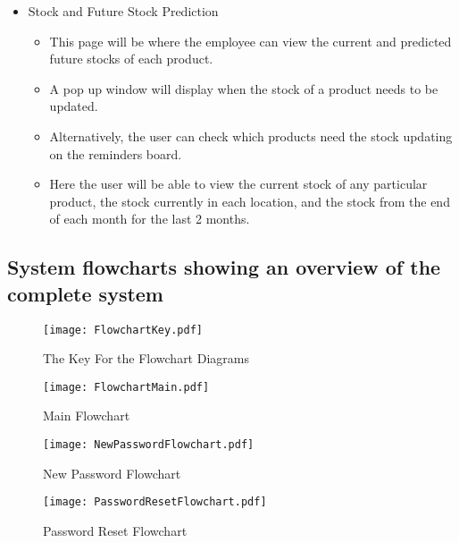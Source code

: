 \begin{itemize}
	\item Stock and Future Stock Prediction
	\begin{itemize}
		\item This page will be where the employee can view the current and predicted future stocks of each product.
		\item A pop up window will display when the stock of a product needs to be updated.
		\item Alternatively, the user can check which products need the stock updating on the reminders board.
		\item Here the user will be able to view the current stock of any particular product, the stock currently in each location, and the stock from the end of each month for the last 2 months.
	\end{itemize}
\end{itemize}

\subsection{System flowcharts showing an overview of the complete system}

\begin{landscape}
\begin{figure}[H]
\caption{The Key For the Flowchart Diagrams} \label{fig:FlowchartKey}
\hfill\texttt{[image: FlowchartKey.pdf]}\hspace*{\fill}
\end{figure}
\pagebreak

\begin{figure}[H]
\caption{Main Flowchart} \label{fig:LogInFlowchart}
\hfill\texttt{[image: FlowchartMain.pdf]}\hspace*{\fill}
\end{figure}
\pagebreak

\begin{figure}[H]
\caption{New Password Flowchart} \label{fig:New Password Flowchart}
\hfill\texttt{[image: NewPasswordFlowchart.pdf]}\hspace*{\fill}
\end{figure}
\pagebreak


\begin{figure}[H]
\caption{Password Reset Flowchart} \label{fig:Password Reset Flowchart}
\hfill\texttt{[image: PasswordResetFlowchart.pdf]}\hspace*{\fill}
\end{figure}
\pagebreak

\end{landscape}

